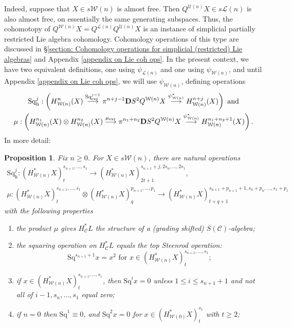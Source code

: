 \documentclass[11pt]{amsart} \renewcommand{\baselinestretch}{1.2}
\theoremstyle{plain}
\newtheorem{prop}[thm]{Proposition}
\numberwithin{equation}{section} %
\theoremstyle{plain}
\newtheorem{prop}[thm]{Proposition}
\numberwithin{equation}{chapter} %
\renewcommand{\to}{\longrightarrow}
\newcommand{\scrC}{\mathscr{C}}
\newcommand{\calU}{\mathcal{U}}
\newcommand{\calL}{\mathcal{L}}
\newcommand{\calw}{\mathcal{W}}
\newcommand{\calc}{\mathcal{C}}
\newcommand{\CommOperad}{{\scrC}}
\newcommand{\ExtCohOp}{\mathrm{Sq}_\mathrm{ext}}
\newcommand{\ExtCohProd}{\mu_\mathrm{ext}}
\newcommand{\Sq}{\mathrm{Sq}}
\newcommand{\dhor}{_\mathrm{h}}
\newcommand{\Sqh}{\mathrm{Sq}\dhor}
\newcommand{\dual}{\mathbf{D}}
\begin{document}
\begin{Cohomology Operations for W and U}
Indeed, suppose that $X\in s\calw(n)$ is almost free. Then $Q^{\calU(n)}X\in s\calL(n)$ is also almost free, on essentially the same generating subspaces. Thus, the cohomotopy of $Q^{\calw(n)}X=Q^{\calL(n)}Q^{\calU(n)}X$ is an instance of simplicial partially restricted Lie algebra cohomology. Cohomology operations of this type are discussed in \S\ref{section: Cohomology operations for simplicial (restricted) Lie algebras} and Appendix \ref{appendix on Lie coh ops}. In the present context, we have two equivalent definitions, one using $\psi_{\calL(n)}$ and one using $\psi_{\calw(n)}$, and until Appendix \ref{appendix on Lie coh ops}, we will use $\psi_{\calw(n)}$, defining operations
\begin{gather*}
\Sqh^j:\left(H_{\calw(n)}^{n}(X)\overset{\ExtCohOp^{j-1}}{\to} \pi^{n+j-1}\dual S^2Q^{\calw(n)}X\overset{\psi_{\calw(n)}^*}{\to} H_{\calw(n)}^{n+j}(X)\right)\textup{ and}\\
\mu:\left(H_{\calw(n)}^{n_1}(X)\otimes H_{\calw(n)}^{n_2}(X)\overset{\ExtCohProd}{\to} \pi^{n_1+n_2}\dual S^2Q^{\calw(n)}X\overset{\psi_{\calw(n)}^*}{\to} H_{\calw(n)}^{n_1+n_2+1}(X)\right).
\end{gather*}
In more detail:
\begin{prop}
\label{Wn Halg omnibus}
Fix $n\geq0$. For $X\in s\calw(n)$, there are natural operations
\begin{gather*}
\Sqh^j:(H^*_{\calw(n)}X)_t^{s_{n+1},\ldots,s_1}\to (H^*_{\calw(n)}X)_{2t+1}^{s_{n+1}+j,2s_{n},\ldots,2s_1},\\
\mu:(H^*_{\calw(n)}X)_t^{s_{n+1},\ldots,s_1}\otimes (H^*_{\calw(n)}X)_q^{p_{n+1},\ldots,p_1}\to (H^*_{\calw(n)}X)_{t+q+1}^{s_{n+1}+p_{n+1}+1,s_{n}+p_{n},\ldots,s_1+p_1}
\end{gather*}
with the following properties
\begin{enumerate}
\item the product $\mu$ gives $H^*_{\calc}L$ the structure of a (grading shifted) $S(\CommOperad)$-algebra;
\item the squaring operation on $H^*_{\calc}L$ equals the \emph{top Steenrod operation}:
\[\Sq^{s_{n+1}+1}x=x^{2}\text{\ \ for $x\in (H^*_{\calw(n)}X)_t^{s_{n+1},\ldots,s_1}$};\]
\item \label{Sq unstable vanishing II} if $x\in (H^*_{\calw(n)}X)_t^{s_{n+1},\ldots,s_1}$, then $\Sq^ix=0$ unless $1\leq i\leq s_{n+1}+1$ and not all of $i-1,s_{n},\ldots,s_1$ equal zero;
\item \label{Sq unstable vanishing III} if $n=0$ then $\Sq^1\equiv 0$, and $\Sq^2x=0$ for $x\in (H^*_{\calw(0)}X)_t^{s_1}$ with $t\geq 2$;

\end{enumerate}
\end{prop}
\end{Cohomology Operations for W and U}
\end{document}
